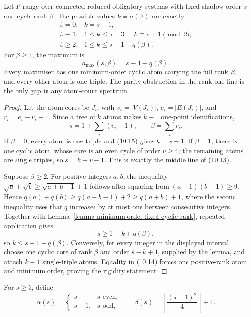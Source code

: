 \begin{theorem}
\label{theorem-exact-canonical-atom-count-spectrum}
Let $F$ range over connected reduced obligatory systems with fixed shadow
order $s$ and cycle rank $\beta$.  The possible values $k=a(F)$ are exactly
\[
\begin{array}{ll}
\beta=0:
  & k=s-1,\\[1mm]
\beta=1:
  & 1\le k\le s-3,\quad k\equiv s+1\pmod 2,\\[1mm]
\beta\ge2:
  & 1\le k\le s-1-q(\beta).
\end{array}
\tag{10.13}
\]
For $\beta\ge1$, the maximum is
\[
a_{\max}(s,\beta)=s-1-q(\beta).
\tag{10.14}
\]
Every maximiser has one minimum-order cyclic atom carrying the full rank
$\beta$, and every other atom is one triple.  The parity obstruction in the
rank-one line is the only gap in any atom-count spectrum.
\end{theorem}
\begin{proof}
Let the atom cores be $J_i$, with $v_i=|V(J_i)|$,
$e_i=|E(J_i)|$, and $r_i=e_i-v_i+1$.  Since a tree of $k$ atoms makes
$k-1$ one-point identifications,
\[
s=1+\sum_i(v_i-1),
\qquad
\beta=\sum_i r_i.
\tag{10.15}
\]
If $\beta=0$, every atom is one triple and (10.15) gives $k=s-1$.
If $\beta=1$, there is one cyclic atom, whose core is an even cycle of order
$v\ge4$; the remaining atoms are single triples, so
$s=k+v-1$.  This is exactly the middle line of (10.13).

Suppose $\beta\ge2$.  For positive integers $a,b$, the inequality
$\sqrt a+\sqrt b\ge\sqrt{a+b-1}+1$ follows after squaring from
$(a-1)(b-1)\ge0$.  Hence
$q(a)+q(b)\ge q(a+b-1)+2\ge q(a+b)+1$, where the second
inequality uses that $q$ increases by at most one between consecutive integers.
Together with Lemma~\ref{lemma-minimum-order-fixed-cyclic-rank}, repeated
application gives
\[
s\ge1+k+q(\beta),
\]
so $k\le s-1-q(\beta)$.  Conversely, for every integer in the displayed
interval choose one cyclic core of rank $\beta$ and order $s-k+1$, supplied by
the lemma, and attach $k-1$ single-triple atoms.  Equality in (10.14) forces
one positive-rank atom and minimum order, proving the rigidity statement.
\end{proof}

For $s\ge3$, define
\[
\alpha(s)=
\begin{cases}
s,&s\text{ even},\\
s+1,&s\text{ odd},
\end{cases}
\qquad
\delta(s)=\left\lfloor\frac{(s-1)^2}{4}\right\rfloor+1.
\]

